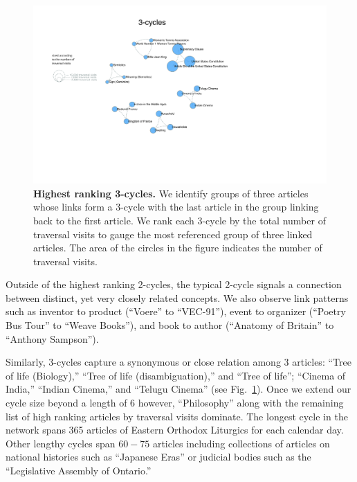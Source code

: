 \documentclass[11pt]{report}
\begin{document}
\begin{figure}[tp!]
  \includegraphics[width=\textwidth]{graphics/3_cycles.pdf}
  \caption{
\textbf{Highest ranking 3-cycles.}
We identify groups of three articles whose links form a 3-cycle with the 
last article in the group linking back to the first article.
We rank each 3-cycle by the total number of traversal visits to gauge
the most referenced group of three linked articles. 
The area of the circles in the figure indicates the number of traversal visits.}
  \label{fig:3-cycles}
\end{figure}

Outside of the highest ranking 2-cycles, the typical 2-cycle signals a connection between distinct, yet very closely related concepts. 
We also observe link patterns such as inventor to product (``Voere'' to ``VEC-91''), event to organizer (``Poetry Bus Tour'' to ``Weave Books''), and book to author (``Anatomy of Britain'' to ``Anthony Sampson'').

Similarly, 3-cycles capture a synonymous or close relation among 3 articles: ``Tree of life (Biology),'' ``Tree of life (disambiguation),'' 
and ``Tree of life''; ``Cinema of India,'' ``Indian Cinema,'' and ``Telugu Cinema''
(see Fig.~\ref{fig:3-cycles}).
Once we extend our cycle size beyond a length of 6 however, 
``Philosophy'' along with the remaining list of high ranking articles by traversal visits dominate.
The longest cycle in the network spans 365 articles of Eastern Orthodox Liturgics for each calendar day.
Other lengthy cycles span $60-75$ articles including collections of articles on national histories such as ``Japanese Eras'' 
or judicial bodies such as the ``Legislative Assembly of Ontario.''
\end{document}
